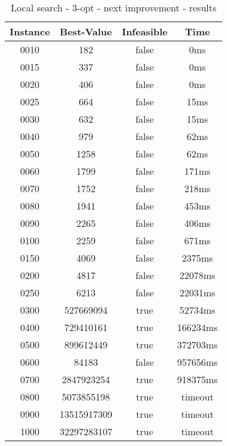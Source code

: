 \begin{table}
\centering
	\begin{tabular}{|| c | c | c | c ||} 
		\hline
		Instance & Best-Value & Infeasible & Time \\
		\hline\hline
0010 & 182 & false & 0ms \\
0015 & 337 & false & 0ms \\
0020 & 406 & false & 0ms \\
0025 & 664 & false & 15ms \\
0030 & 632 & false & 15ms \\
0040 & 979 & false & 62ms \\
0050 & 1258 & false & 62ms \\
0060 & 1799 & false & 171ms \\
0070 & 1752 & false & 218ms \\
0080 & 1941 & false & 453ms \\
0090 & 2265 & false & 406ms \\
0100 & 2259 & false & 671ms \\
0150 & 4069 & false & 2375ms \\
0200 & 4817 & false & 22078ms \\
0250 & 6213 & false & 22031ms \\
0300 & 527669094 & true & 52734ms \\
0400 & 729410161 & true & 166234ms \\
0500 & 899612449 & true & 372703ms \\
0600 & 84183 & false & 957656ms \\
0700 & 2847923254 & true & 918375ms \\
0800 & 5073855198 & true & timeout \\
0900 & 13515917309 & true & timeout \\
1000 & 32297283107 & true & timeout \\
		\hline
	\end{tabular}
\caption{Local search - 3-opt - next improvement - results}
\end{table}


